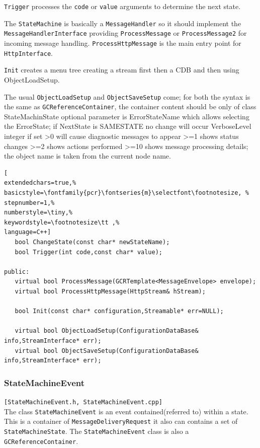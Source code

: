 \texttt{Trigger} processes the \texttt{code} or \texttt{value} arguments to determine the next state.

The \texttt{StateMachine} is basically a \texttt{MessageHandler} so it should implement the \texttt{MessageHandlerInterface} providing \texttt{ProcessMessage} or \texttt{ProcessMessage2} for incoming message handling. \texttt{ProcessHttpMessage} is the main entry point for \texttt{HttpInterface}.

\texttt{Init} creates a menu tree creating a stream first then a CDB and then using ObjectLoadSetup.

The usual \texttt{ObjectLoadSetup} and \texttt{ObjectSaveSetup} come; for both the syntax is the same as \texttt{GCReferenceContainer}, the container content should be only of class StateMachinState optional parameter is ErrorStateName which allows selecting the ErrorState; if NextState is SAMESTATE no change will occur VerboseLevel {integer} if set >0 will cause diagnostic messages to appear >=1 shows status changes >=2 shows actions performed >=10 shows message processing details; the object name is taken from the current node name.

\begin{lstlisting}[
extendedchars=true,%
basicstyle=\fontfamily{pcr}\fontseries{m}\selectfont\footnotesize, %
stepnumber=1,%
numberstyle=\tiny,%
keywordstyle=\footnotesize\tt ,%
language=C++]
   bool ChangeState(const char* newStateName);
   bool Trigger(int code,const char* value);

public:
   virtual bool ProcessMessage(GCRTemplate<MessageEnvelope> envelope);
   virtual bool ProcessHttpMessage(HttpStream& hStream);

   bool Init(const char* configuration,Streamable* err=NULL);

   virtual bool ObjectLoadSetup(ConfigurationDataBase& info,StreamInterface* err);
   virtual bool ObjectSaveSetup(ConfigurationDataBase& info,StreamInterface* err);
\end{lstlisting}



\subsubsection{StateMachineEvent}
\texttt{[StateMachineEvent.h, StateMachineEvent.cpp]}\\
The class \texttt{StateMachineEvent} is an event contained(referred to) within a state. This is a container of \texttt{MessageDeliveryRequest} it also can contains a set of \texttt{StateMachineState}.
The \texttt{StateMachineEvent} class is also a \texttt{GCReferenceContainer}.

